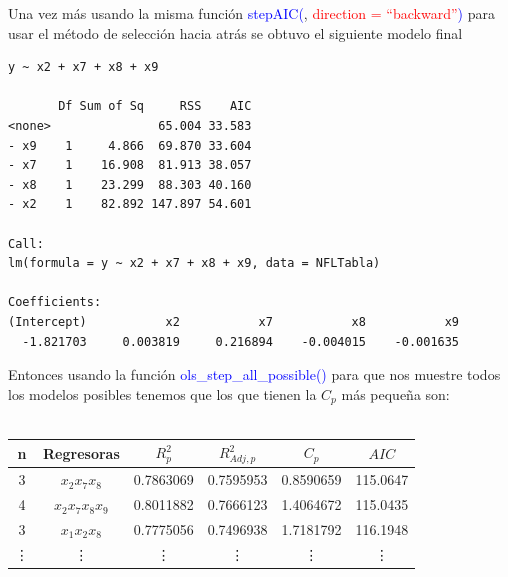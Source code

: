 \documentclass[11pt]{beamer}
\begin{document}
\begin{frame}[fragile]
Una vez más usando la misma función \textcolor{blue}{stepAIC(}, \textcolor{red}{direction = ``backward''}\textcolor{blue}{)} para usar el método de selección hacia atrás se obtuvo el siguiente modelo final

\begin{lstlisting}[basicstyle=\tiny]
y ~ x2 + x7 + x8 + x9

       Df Sum of Sq     RSS    AIC
<none>               65.004 33.583
- x9    1     4.866  69.870 33.604
- x7    1    16.908  81.913 38.057
- x8    1    23.299  88.303 40.160
- x2    1    82.892 147.897 54.601

Call:
lm(formula = y ~ x2 + x7 + x8 + x9, data = NFLTabla)

Coefficients:
(Intercept)           x2           x7           x8           x9  
  -1.821703     0.003819     0.216894    -0.004015    -0.001635 
\end{lstlisting}

\end{frame}


\begin{frame}
Entonces usando la función \textcolor{blue}{ols\_step\_all\_possible()} para que nos muestre todos los modelos posibles tenemos que los que tienen la $C_{p}$ más pequeña son:\\~\\

\begin{adjustbox}{width=1\textwidth}
\begin{tabular}{cccccc}
\hline 
n & Regresoras & $R^{2}_{p}$ & $R^{2}_{Adj,p}$ & $C_{p}$ & $AIC$ \\ 
\hline 
3 & $x_{2}x_{7}x_{8}$ & 0.7863069 & 0.7595953 & 0.8590659 & 115.0647 \\ 
4 & $x_{2}x_{7}x_{8}x_{9}$ & 0.8011882 & 0.7666123 & 1.4064672 & 115.0435 \\ 
3 & $x_{1}x_{2}x_{8}$ & 0.7775056 & 0.7496938
 & 1.7181792 & 116.1948 \\ 
\vdots & \vdots & \vdots & \vdots & \vdots & \vdots \\ 
\hline 
\end{tabular} 
\end{adjustbox}

\end{frame}
\end{document}
